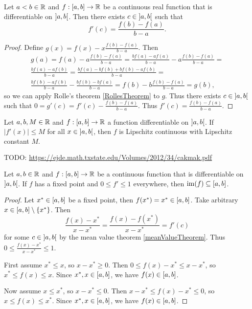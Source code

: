 \begin{theorem} \label{meanValueTheorem}
Let $a<b\in \mathbb{R}$ and $f: \interval{a,b}\to \R$ be a continuous real function that is differentiable on $\interval[o]{a,b}$. Then there exists $c\in \interval[o]{a,b}$ such that
\[f'(c) = \frac{f(b)-f(a)}{b-a}. \]
\end{theorem}
\begin{proof}
Define $g(x) = f(x) - x\frac{f(b)-f(a)}{b-a}$. Then
\begin{multline*}
g(a) = f(a) - a\frac{f(b)-f(a)}{b-a} = \frac{bf(a) - af(a)}{b-a} - a\frac{f(b)-f(a)}{b-a} = \\ \frac{bf(a)-af(b)}{b-a} = \frac{bf(a)-bf(b) + bf(b)-af(b)}{b-a} = \\ \frac{bf(b) - af(b)}{b-a} - \frac{bf(b) - bf(a)}{b-a} = f(b) - b \frac{f(b)-f(a)}{b-a} = g(b),
\end{multline*}
so we can apply Rolle's theorem \ref{RollesTheorem} to $g$. Thus there exists $c\in \interval[o]{a,b}$ such that $0 = g'(c) = f'(c) - \frac{f(b)-f(a)}{b-a}$. Thus $f'(c) = \frac{f(b)-f(a)}{b-a}$.
\end{proof}
\begin{corollary}
Let $a,b, M\in \mathbb{R}$ and $f:\interval{a,b}\to \R$ a function differentiable on $\interval[o]{a,b}$. If $|f'(x)| \leq M$ for all $x\in \interval[o]{a,b}$, then $f$ is Lipschitz continuous with Lipschitz constant $M$.
\end{corollary}

TODO: \url{https://ejde.math.txstate.edu/Volumes/2012/34/cakmak.pdf}

\begin{lemma} \label{boundDerivativeAndFixedPointGivesRange}
Let $a,b\in \mathbb{R}$ and $f:\interval{a,b}\to \R$ be a continuous function that is differentiable on $\interval[o]{a,b}$. If $f$ has a fixed point and $0\leq f' \leq 1$ everywhere, then $\im(f)\subseteq \interval{a,b}$. 
\end{lemma}
\begin{proof}
Let $x^*\in \interval{a,b}$ be a fixed point, then $f(x^*) = x^* \in \interval{a,b}$. Take arbitrary $x\in \interval{a,b}\setminus\{x^*\}$. Then
\[ \frac{f(x) - x^*}{x - x^*} = \frac{f(x) - f(x^*)}{x - x^*} = f'(c) \]
for some $c\in \interval[o]{a,b}$ by the mean value theorem \ref{meanValueTheorem}. Thus $0\leq \frac{f(x) - x^*}{x - x^*} \leq 1$.

First assume $x^* \leq x$, so $x - x^* \geq 0$. Then $0 \leq f(x) - x^* \leq x - x^*$, so $x^* \leq f(x) \leq x$. Since $x^*, x\in \interval{a,b}$, we have $f(x)\in \interval{a,b}$.

Now assume $x\leq x^*$, so $x - x^* \leq 0$. Then $x - x^* \leq f(x) - x^* \leq 0$, so $x \leq f(x) \leq x^*$. Since $x^*, x\in \interval{a,b}$, we have $f(x)\in \interval{a,b}$.
\end{proof}

